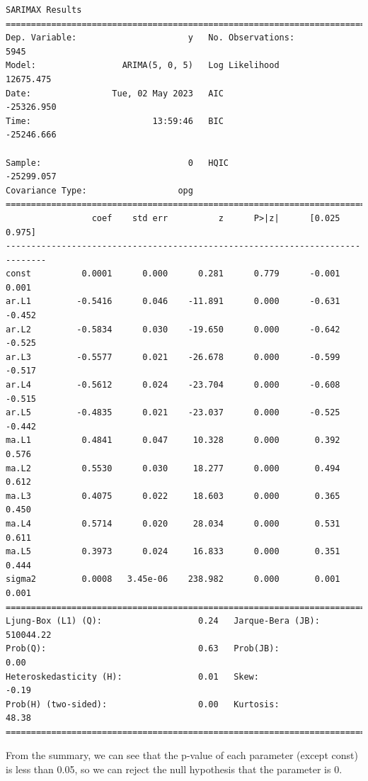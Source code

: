 \documentclass[runningheads]{llncs}
\begin{document}
\begin{verbatim}
SARIMAX Results                        
==============================================================================
Dep. Variable:                      y   No. Observations:                 5945
Model:                 ARIMA(5, 0, 5)   Log Likelihood               12675.475
Date:                Tue, 02 May 2023   AIC                         -25326.950
Time:                        13:59:46   BIC                         -25246.666

Sample:                             0   HQIC                        -25299.057                                       
Covariance Type:                  opg                                         
==============================================================================
                 coef    std err          z      P>|z|      [0.025      0.975]
------------------------------------------------------------------------------
const          0.0001      0.000      0.281      0.779      -0.001       0.001
ar.L1         -0.5416      0.046    -11.891      0.000      -0.631      -0.452
ar.L2         -0.5834      0.030    -19.650      0.000      -0.642      -0.525
ar.L3         -0.5577      0.021    -26.678      0.000      -0.599      -0.517
ar.L4         -0.5612      0.024    -23.704      0.000      -0.608      -0.515
ar.L5         -0.4835      0.021    -23.037      0.000      -0.525      -0.442
ma.L1          0.4841      0.047     10.328      0.000       0.392       0.576
ma.L2          0.5530      0.030     18.277      0.000       0.494       0.612
ma.L3          0.4075      0.022     18.603      0.000       0.365       0.450
ma.L4          0.5714      0.020     28.034      0.000       0.531       0.611
ma.L5          0.3973      0.024     16.833      0.000       0.351       0.444
sigma2         0.0008   3.45e-06    238.982      0.000       0.001       0.001
===================================================================================
Ljung-Box (L1) (Q):                   0.24   Jarque-Bera (JB):            510044.22
Prob(Q):                              0.63   Prob(JB):                         0.00
Heteroskedasticity (H):               0.01   Skew:                            -0.19
Prob(H) (two-sided):                  0.00   Kurtosis:                        48.38
===================================================================================
\end{verbatim}

From the summary, we can see that the p-value of each parameter (except const) is less than 0.05, so we can reject the null hypothesis that the parameter is 0.
\end{document}
